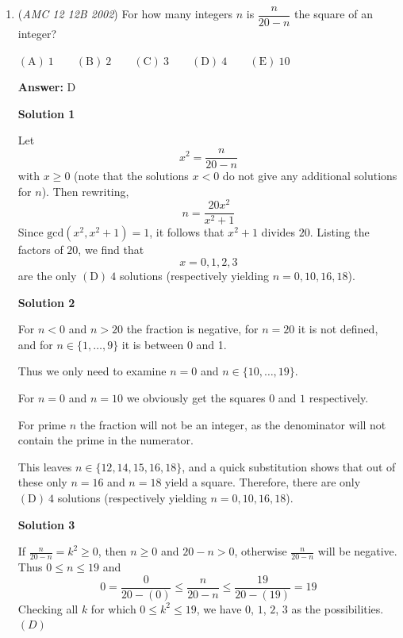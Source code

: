 \begin{enumerate}
\textbf{Solution 3 (intuitive)}

Trying out some primes for $A$ and $B$ such that $A-B$ and $A+B$ are prime, $A=5$ and $B=2$ can be found almost immediately. Summing the four primes, the result is $5+2+3+7=17$, which is $\boxed{\mathrm{(E)}\ \text{prime}}$.

 


	\item (\textit{AMC 12 12B 2002}) For how many integers $n$ is $\dfrac n{20-n}$ the square of an integer?


 $\mathrm{(A)}\ 1 \qquad\mathrm{(B)}\ 2 \qquad\mathrm{(C)}\ 3 \qquad\mathrm{(D)}\ 4 \qquad\mathrm{(E)}\ 10$

 \textbf{Answer: }D



\textbf{Solution 1}

Let
 \[x^2 = \frac{n}{20-n}\] with $x \ge 0$ (note that the solutions $x < 0$ do not give any additional solutions for $n$). Then rewriting, 
 \[n = \frac{20x^2}{x^2 + 1}\]Since $\text{gcd}(x^2, x^2 + 1) = 1$, it follows that $x^2 + 1$ divides $20$. Listing the factors of $20$, we find that 
 \[x = 0, 1, 2 , 3\]are the only $\boxed{\mathrm{(D)}\ 4}$ solutions (respectively yielding $n = 0, 10, 16, 18$).

 



\textbf{Solution 2}

For $n<0$ and $n>20$ the fraction is negative, for $n=20$ it is not defined, and for $n\in\{1,\dots,9\}$ it is between 0 and 1.

 Thus we only need to examine $n=0$ and $n\in\{10,\dots,19\}$.

 For $n=0$ and $n=10$ we obviously get the squares $0$ and $1$ respectively.

 For prime $n$ the fraction will not be an integer, as the denominator will not contain the prime in the numerator.

 This leaves $n\in\{12,14,15,16,18\}$, and a quick substitution shows that out of these only $n=16$ and $n=18$ yield a square. Therefore, there are only $\boxed{\mathrm{(D)}\ 4}$ solutions (respectively yielding $n = 0, 10, 16, 18$).

 



\textbf{Solution 3}

If $\frac{n}{20-n} = k^2 \ge 0$, then $n \ge 0$ and $20-n > 0$, otherwise $\frac{n}{20-n}$ will be negative. Thus $0 \le n \le 19$ and 
 \[0 = \frac{0}{20-(0)} \le \frac{n}{20-n} \le \frac{19}{20-(19)} = 19\] Checking all $k$ for which $0 \le k^2 \le 19$, we have $0$, $1$, $2$, $3$ as the possibilities. $\boxed{(D)}$





\end{enumerate}
